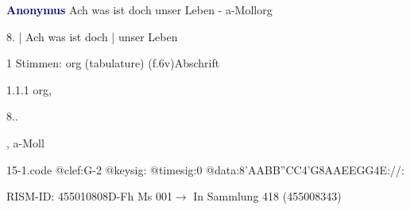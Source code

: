 \documentclass[twocolumn, 12pt]{book}
\begin{document}
\par \vspace{16pt} \textcolor{darkblue}{\textbf{Anonymus  }}\hfillplus{\textbf{[15]}}\newline Ach was ist doch unser Leben - a-Moll\newline org
\par \begin{itshape}[f.6v, at left:] 8. | Ach was ist doch | unser Leben\end{itshape} 
\par \textcolor{darkblue}{}  1 Stimmen: org (tabulature)  (f.6v)\newline Abschrift
\par 1.1.1  org, \begin{itshape}8..\end{itshape}, a-Moll  
\begin{filecontents*}{15-1.code}
@clef:G-2
@keysig:
@timesig:0
@data:{8'AABB}{''CC}4'G{8AAEE}{GG}4E://:
\end{filecontents*}
\newline %
\par RISM-ID: 455010808\newline D-Fh  Ms 001\newline $\rightarrow$ In Sammlung 418 (455008343)
      
\end{document}
